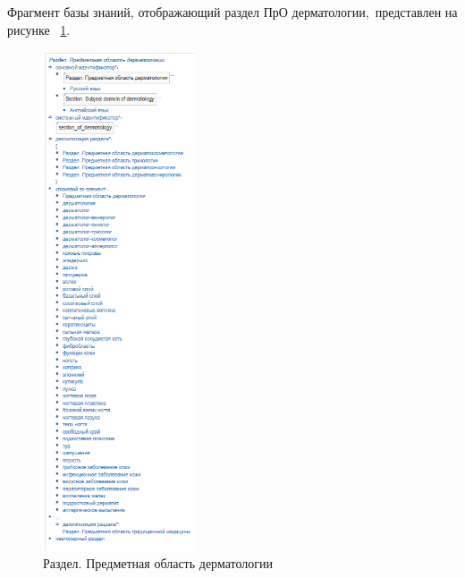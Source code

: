 Фрагмент базы знаний, отображающий раздел ПрО дерматологии$,$ представлен на рисунке ~\ref{fig:sections/section_of_dermatology}.
\begin{figure}[H]
	\centering
	\includegraphics[width=0.4\textwidth]{sections/section_of_dermatology.png}
	\caption{Раздел. Предметная область дерматологии}
	\label{fig:sections/section_of_dermatology}
\end{figure}

